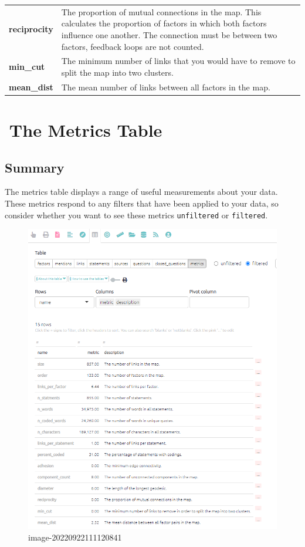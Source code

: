 \documentclass[
]{book}
\begin{document}
\begin{longtable}[]{@{}
  >{\raggedright\arraybackslash}p{}
  >{\raggedright\arraybackslash}p{}@{}}
\textbf{reciprocity} & The proportion of mutual connections in the map. This calculates the proportion of factors in which both factors influence one another. The connection must be between two factors, feedback loops are not counted. \\
\textbf{min\_cut} & The minimum number of links that you would have to remove to split the map into two clusters. \\
\textbf{mean\_dist} & The mean number of links between all factors in the map. \\
\bottomrule
\end{longtable}

\hypertarget{xmetrics}{%
\chapter{🧪The Metrics Table}\label{xmetrics}}

\hypertarget{summary-2}{%
\section{Summary}\label{summary-2}}

The metrics table displays a range of useful measurements about your data. These metrics respond to any filters that have been applied to your data, so consider whether you want to see these metrics \texttt{unfiltered} or \texttt{filtered}.

\begin{figure}
\centering
\includegraphics[width=6.77083in,height=\textheight]{_assets/image-20220922111120841.png}
\caption{image-20220922111120841}
\end{figure}
\end{document}
